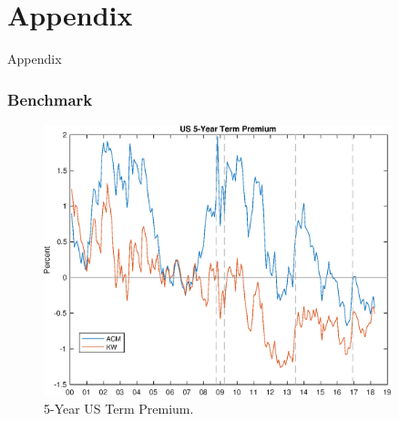 \documentclass[12pt, xcolor=dvipsnames]{beamer} 			         %
\begin{document}
\section{Appendix}

\begin{frame}
	\begin{center}
		\huge \textcolor{yaleblue}{Appendix}
	\end{center}
\end{frame}

\begin{frame}
\frametitle{Benchmark}
\begin{figure}[!htbp]
	\begin{center}
		\includegraphics[width=0.9\textwidth,height=0.65\textheight]{../Figures/rp_us_5yr_ACMvsKM}
		\par\end{center}
	\caption{5-Year US Term Premium.}\label{fig:tp_us_5yr}
\end{figure}
\end{frame}
\end{document}
